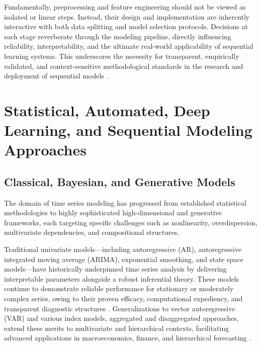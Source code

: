 \documentclass[sigconf]{acmart}
\begin{document}
Fundamentally, preprocessing and feature engineering should not be viewed as isolated or linear steps. Instead, their design and implementation are inherently interactive with both data splitting and model selection protocols. Decisions at each stage reverberate through the modeling pipeline, directly influencing reliability, interpretability, and the ultimate real-world applicability of sequential learning systems. This underscores the necessity for transparent, empirically validated, and context-sensitive methodological standards in the research and deployment of sequential models~\cite{ref5,ref14,ref30,ref83,ref85,ref87}.

\section{Statistical, Automated, Deep Learning, and Sequential Modeling Approaches}

\subsection{Classical, Bayesian, and Generative Models}

The domain of time series modeling has progressed from established statistical methodologies to highly sophisticated high-dimensional and generative frameworks, each targeting specific challenges such as nonlinearity, overdispersion, multivariate dependencies, and compositional structures.

Traditional univariate models—including autoregressive (AR), autoregressive integrated moving average (ARIMA), exponential smoothing, and state space models—have historically underpinned time series analysis by delivering interpretable parameters alongside a robust inferential theory. These models continue to demonstrate reliable performance for stationary or moderately complex series, owing to their proven efficacy, computational expediency, and transparent diagnostic structures \cite{ref1, ref3, ref4, ref5, ref6, ref7, ref8, ref10, ref12, ref13, ref19, ref21, ref22, ref23, ref26, ref29, ref61, ref62, ref63, ref64, ref65, ref66, ref86}. Generalizations to vector autoregressive (VAR) and various index models, aggregated and disaggregated approaches, extend these merits to multivariate and hierarchical contexts, facilitating advanced applications in macroeconomics, finance, and hierarchical forecasting \cite{ref13, ref19, ref22, ref23, ref26, ref29, ref61}.
\end{document}
